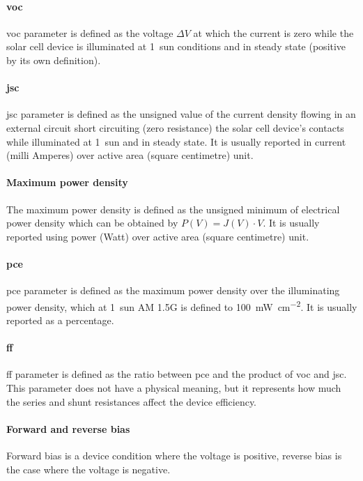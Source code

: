 \paragraph{\Glsdesc{voc}} \Gls{voc} parameter is defined as the voltage $\Delta V$ at which the current is zero while the solar cell device is illuminated at 1~sun conditions and in steady state (positive by its own definition).

\paragraph{\Glsdesc{jsc}} \Gls{jsc} parameter is defined as the unsigned value of the current density flowing in an external circuit short circuiting (zero resistance) the solar cell device's contacts while illuminated at 1~sun and in steady state. It is usually reported in current (milli Amperes) over active area (square centimetre) unit.

\paragraph{Maximum power density} The maximum power density is defined as the unsigned minimum of electrical power density which can be obtained by $P(V) = J(V) \cdot V$. It is usually reported using power (Watt) over active area (square centimetre) unit.

\paragraph{\Glsdesc{pce}} \Gls{pce} parameter is defined as the maximum power density over the illuminating power density, which at 1~sun AM 1.5G is defined to \SI{100}{\mW\per\square\cm}. It is usually reported as a percentage.

\paragraph{\Glsdesc{ff}} \Gls{ff} parameter is defined as the ratio between \gls{pce} and the product of \gls{voc} and \gls{jsc}. This parameter does not have a physical meaning, but it represents how much the series and shunt resistances affect the device efficiency.

\paragraph{Forward and reverse bias} Forward bias is a device condition where the voltage is positive, reverse bias is the case where the voltage is negative.

